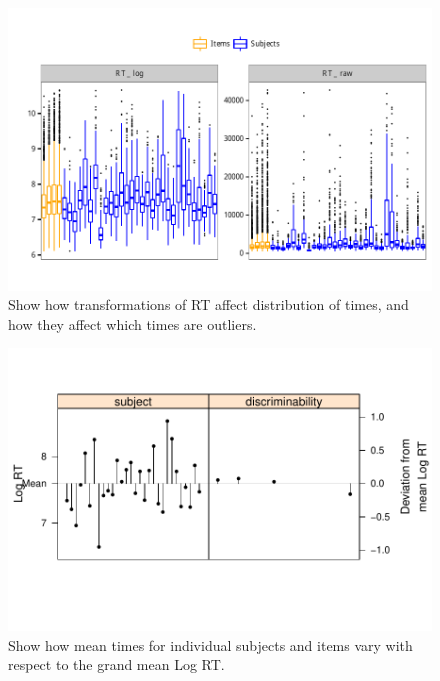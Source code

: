 \documentclass[a4paper,12pt]{article}\usepackage[]{graphicx}\usepackage[]{color}
\makeatletter
\def\maxwidth{ %
  \ifdim\Gin@nat@width>\linewidth
    \linewidth
  \else
    \Gin@nat@width
  \fi
}
\newenvironment{knitrout}{}{} %
\makeatother
\begin{document}
\begin{knitrout}\scriptsize
{}\color{fgcolor}\begin{figure}[hbtp]

{\centering \includegraphics[width=\maxwidth]{figure/graphics-plotBoxPlots-1} 

}

\caption[Show how transformations of RT affect distribution of times, and how they affect which times are outliers]{Show how transformations of RT affect distribution of times, and how they affect which times are outliers.}\label{fig:plotBoxPlots}
\end{figure}


\end{knitrout}

\clearpage

\begin{knitrout}\scriptsize
{}\color{fgcolor}\begin{figure}[hbtp]

{\centering \includegraphics[width=\maxwidth]{figure/graphics-plotFastSlowRTs-1} 

}

\caption[Show how mean times for individual subjects and items vary with respect to the grand mean Log RT]{Show how mean times for individual subjects and items vary with respect to the grand mean Log RT.}\label{fig:plotFastSlowRTs}
\end{figure}


\end{knitrout}
\end{document}
